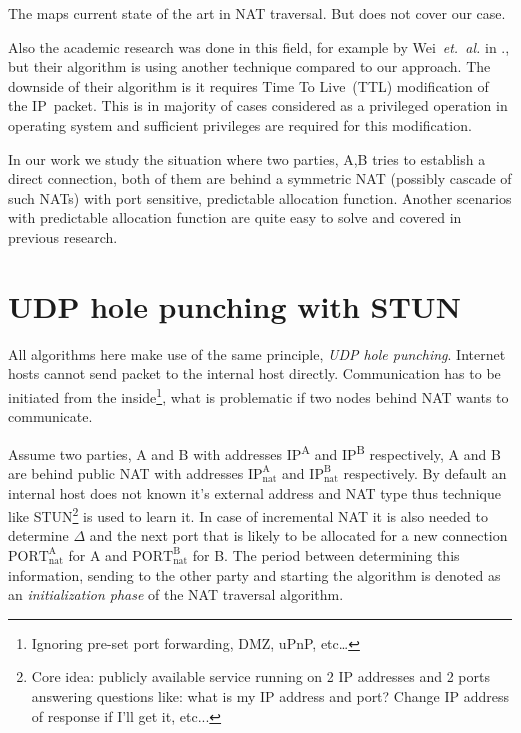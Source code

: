 \documentclass[twoside]{article}
\begin{document}
\begin{multicols}{2}
The \citep{rfc5128} maps current state of the art in NAT traversal. But does not cover our case.

Also the academic research was done in this field, for example by Wei~\emph{et.~al.} in \citep{wei}., but their algorithm is using another technique compared
to our approach. The downside of their algorithm is it requires Time To Live~(TTL) modification of the IP~packet. This is in majority of cases considered
as a privileged operation in operating system and sufficient privileges are required for this modification. 

In our work we study the situation where two parties, A,B tries to establish a direct connection, both of them are behind 
a symmetric NAT (possibly cascade of such NATs) with port sensitive, predictable allocation function. Another scenarios with
predictable allocation function are quite easy to solve and covered in previous research. 


\section{UDP hole punching with STUN}
All algorithms here make use of the same principle, \emph{UDP hole punching}. 
Internet hosts cannot send packet to the internal host directly. 
Communication has to be initiated from the inside\footnote{Ignoring 
pre-set port forwarding, DMZ, uPnP, etc\dots}, what is problematic if two nodes behind 
NAT wants to communicate.

Assume two parties, A and B with addresses IP\textsuperscript{A} and IP\textsuperscript{B} respectively,
A and B are behind public NAT with addresses $\text{IP}^{\text{A}}_{\text{nat}}$ and $\text{IP}^{\text{B}}_{\text{nat}}$
respectively. By default an internal host does not known it's external address and NAT type thus technique like 
STUN\footnote{Core idea: publicly available service running on 2 IP addresses and 2 ports 
answering questions like: what is my IP address and port? Change IP address of response if I'll get it, etc...} 
is used to learn it. In case of incremental NAT it is also needed to determine $\Delta$ and the next port
that is likely to be allocated for a new connection $\text{PORT}^{\text{A}}_{\text{nat}}$ for A and $\text{PORT}^{\text{B}}_{\text{nat}}$
for B. The period between determining this information, sending to the other party and starting the algorithm is
denoted as an \emph{initialization phase} of the NAT traversal algorithm. 


\end{multicols}
\end{document}
